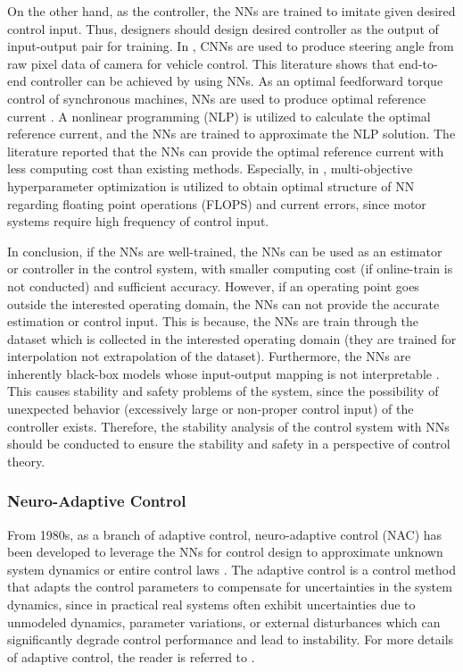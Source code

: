 On the other hand, as the controller, the NNs are trained to imitate given desired control input.
Thus, designers should design desired controller as the output of input-output pair for training.
In \cite{RN117, RN116}, CNNs are used to produce steering angle from raw pixel data of camera for vehicle control.
This literature shows that end-to-end controller can be achieved by using NNs. 
As an optimal feedforward torque control of synchronous machines, NNs are used to produce optimal reference current \cite{RN112, RN113, RN114}.
A nonlinear programming (NLP) is utilized to calculate the optimal reference current, and the NNs are trained to approximate the NLP solution.
The literature reported that the NNs can provide the optimal reference current with less computing cost than existing methods.
Especially, in \cite{RN114}, multi-objective hyperparameter optimization is utilized to obtain optimal structure of NN regarding floating point operations (FLOPS) and current errors, since motor systems require high frequency of control input.

In conclusion, if the NNs are well-trained, the NNs can be used as an estimator or controller in the control system, with smaller computing cost (if online-train is not conducted) and sufficient accuracy.
However, if an operating point goes outside the interested operating domain, the NNs can not provide the accurate estimation or control input.
This is because, the NNs are train through the dataset which is collected in the interested operating domain (\ie they are trained for interpolation not extrapolation of the dataset).
Furthermore, the NNs are inherently black-box models whose input-output mapping is not interpretable \cite{RN16, RN17}.
This causes stability and safety problems of the system, since the possibility of unexpected behavior (\eg excessively large or non-proper control input) of the controller exists.
Therefore, the stability analysis of the control system with NNs should be conducted to ensure the stability and safety in a perspective of control theory.

\subsubsection{Neuro-Adaptive Control}

From 1980s, as a branch of adaptive control, neuro-adaptive control (NAC) has been developed to leverage the NNs for control design to approximate unknown system dynamics or entire control laws \cite{RN5, RN48}.
The adaptive control is a control method that adapts the control parameters to compensate for uncertainties in the system dynamics, since in practical real systems often exhibit uncertainties due to unmodeled dynamics, parameter variations, or external disturbances which can significantly degrade control performance and lead to instability. 
For more details of adaptive control, the reader is referred to \cite{RN6, RN10}. 


